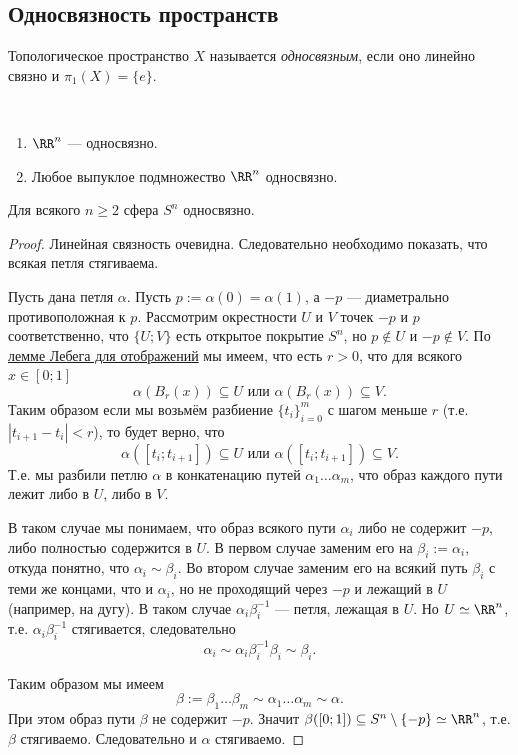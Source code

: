 \documentclass[12pt,a4paper]{article}
\begin{document}
    \subsection{Односвязность пространств}

    \begin{definition}
        Топологическое пространство $X$ называется \emph{односвязным}, если оно линейно связно и $\pi_1(X) = \{e\}$.
    \end{definition}

    \begin{example}\ 
        \begin{enumerate}
            \item $\RR^n$ --- односвязно.
            \item Любое выпуклое подмножество $\RR^n$ односвязно.
        \end{enumerate}
    \end{example}

    \begin{theorem}
        Для всякого $n \geqslant 2$ сфера $S^n$ односвязно.
    \end{theorem}

    \begin{proof}
        Линейная связность очевидна. Следовательно необходимо показать, что всякая петля стягиваема.

        Пусть дана петля $\alpha$. Пусть $p := \alpha(0) = \alpha(1)$, а $-p$ --- диаметрально противоположная к $p$. Рассмотрим окрестности $U$ и $V$ точек $-p$ и $p$ соответственно, что $\{U; V\}$ есть открытое покрытие $S^n$, но $p \notin U$ и $-p \notin V$. По \hyperref[Lebesgue-lemma-functional-corollary]{лемме Лебега для отображений} мы имеем, что есть $r > 0$, что для всякого $x \in [0; 1]$
        \[\alpha(B_r(x)) \subseteq U \text{ или } \alpha(B_r(x)) \subseteq V.\]
        Таким образом если мы возьмём разбиение $\{t_i\}_{i=0}^m$ с шагом меньше $r$ (т.е. $|t_{i+1} - t_i| < r$), то будет верно, что
        \[\alpha([t_i; t_{i+1}]) \subseteq U \text{ или } \alpha([t_i; t_{i+1}]) \subseteq V.\]
        Т.е. мы разбили петлю $\alpha$ в конкатенацию путей $\alpha_1 \dots \alpha_m$, что образ каждого пути лежит либо в $U$, либо в $V$.

        В таком случае мы понимаем, что образ всякого пути $\alpha_i$ либо не содержит $-p$, либо полностью содержится в $U$. В первом случае заменим его на $\beta_i := \alpha_i$, откуда понятно, что $\alpha_i \sim \beta_i$. Во втором случае заменим его на всякий путь $\beta_i$ с теми же концами, что и $\alpha_i$, но не проходящий через $-p$ и лежащий в $U$ (например, на дугу). В таком случае $\alpha_i\beta_i^{-1}$ --- петля, лежащая в $U$. Но $U \simeq \RR^n$, т.е. $\alpha_i \beta_i^{-1}$ стягивается, следовательно \[\alpha_i \sim \alpha_i \beta_i^{-1} \beta_i \sim \beta_i.\]

        Таким образом мы имеем
        \[\beta := \beta_1 \dots \beta_m \sim \alpha_1 \dots \alpha_m \sim \alpha.\]
        При этом образ пути $\beta$ не содержит $-p$. Значит $\beta([0; 1]) \subseteq S^n \setminus \{-p\} \simeq \RR^n$, т.е. $\beta$ стягиваемо. Следовательно и $\alpha$ стягиваемо.
    \end{proof}
\end{document}
